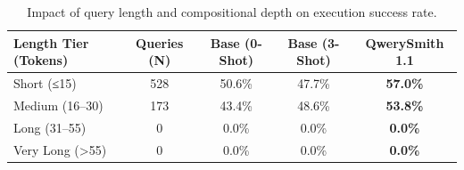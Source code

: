 \begin{table}[t]
\centering\small
\begin{tabular}{lcccc}
\toprule
\textbf{Length Tier (Tokens)} & \textbf{Queries (N)} & \textbf{Base (0-Shot)} & \textbf{Base (3-Shot)} & \textbf{QwerySmith 1.1} \\
\midrule
Short (≤15) & 528 & 50.6\% & 47.7\% & \textbf{57.0\%} \\
Medium (16–30) & 173 & 43.4\% & 48.6\% & \textbf{53.8\%} \\
Long (31–55) & 0 & 0.0\% & 0.0\% & \textbf{0.0\%} \\
Very Long (>55) & 0 & 0.0\% & 0.0\% & \textbf{0.0\%} \\
\bottomrule
\end{tabular}
\caption{Impact of query length and compositional depth on execution success rate.}
\label{tab:length_stratification}
\end{table}
